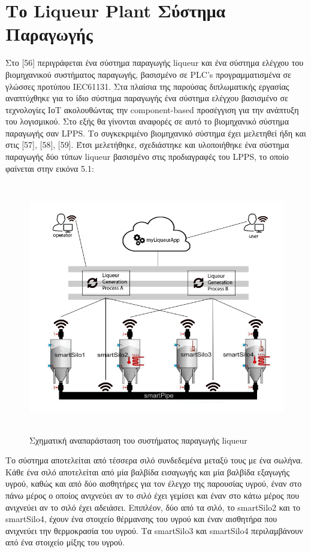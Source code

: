 \chapter{Το Liqueur Plant Σύστημα Παραγωγής} %

\label{Chapter5} 

Στο [56] περιγράφεται ένα σύστημα παραγωγής liqueur και ένα σύστημα ελέγχου του βιομηχανικού συστήματος παραγωγής, βασισμένο σε PLC’s προγραμματισμένα σε γλώσσες προτύπου IEC61131. Στα πλαίσια της παρούσας διπλωματικής εργασίας αναπτύχθηκε για το ίδιο σύστημα παραγωγής ένα σύστημα ελέγχου βασισμένο σε τεχνολογίες ΙοΤ ακολουθώντας την component-based προσέγγιση για την ανάπτυξη του λογισμικού. Στο εξής θα γίνονται αναφορές σε αυτό το βιομηχανικό σύστημα παραγωγής σαν LPPS. Το συγκεκριμένο βιομηχανικό σύστημα έχει μελετηθεί ήδη και στις [57], [58], [59]. Έτσι μελετήθηκε, σχεδιάστηκε και υλοποιήθηκε ένα σύστημα παραγωγής  δύο τύπων liqueur βασισμένο στις προδιαγραφές του LPPS, το οποίο φαίνεται στην εικόνα 5.1:


\begin{figure}[htbp]
	\centering
		\includegraphics[height=11cm,width=15cm]{Figures/11.png}
	\caption{Σχηματική αναπαράσταση του συστήματος παραγωγής liqueur \cite{Thrampo3} }	
\end{figure}


	Το σύστημα αποτελείται από τέσσερα σιλό συνδεδεμένα μεταξύ τους με ένα σωλήνα. Κάθε ένα σιλό αποτελείται από μία βαλβίδα εισαγωγής και μία βαλβίδα εξαγωγής υγρού, καθώς και από δύο αισθητήρες για τον έλεγχο της παρουσίας υγρού, έναν στο πάνω μέρος ο οποίος ανιχνεύει αν το σιλό έχει γεμίσει  και έναν στο κάτω μέρος που ανιχνεύει αν το σιλό έχει αδειάσει. Επιπλέον, δύο από τα σιλό, το smartSilo2 και το smartSilo4, έχουν ένα στοιχείο θέρμανσης του υγρού και έναν αισθητήρα που ανιχνεύει την θερμοκρασία του υγρού. Τα smartSilo3 και smartSilo4 περιλαμβάνουν από ένα στοιχείο μίξης του υγρού. 

